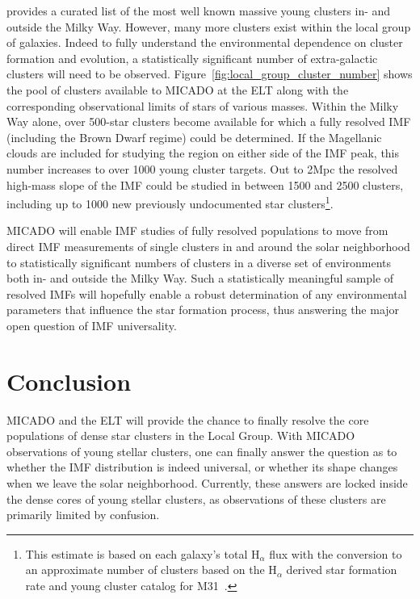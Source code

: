 \documentclass{aa}
\begin{document}
\citet{portegies2010} provides a curated list of the most well known massive young clusters in- and outside the Milky Way.
However, many more clusters exist within the local group of galaxies.
Indeed to fully understand the environmental dependence on cluster formation and evolution, a statistically significant number of extra-galactic clusters will need to be observed.
Figure~\ref{fig:local_group_cluster_number} shows the pool of clusters available to MICADO at the ELT along with the corresponding observational limits of stars of various masses.
Within the Milky Way alone, over 500-star clusters become available for which a fully resolved IMF (including the Brown Dwarf regime) could be determined.
If the Magellanic clouds are included for studying the region on either side of the IMF peak, this number increases to over 1000 young cluster targets.
Out to 2Mpc the resolved high-mass slope of the IMF could be studied in between 1500 and 2500 clusters, including up to 1000 new previously undocumented star clusters\footnote{This estimate is based on each galaxy's total H$_\alpha$ flux with the conversion to an approximate number of clusters based on the H$_\alpha$ derived star formation rate and young cluster catalog for M31~\citep{caldwell09}.}.

MICADO will enable IMF studies of fully resolved populations to move from direct IMF measurements of single clusters in and around the solar neighborhood to statistically significant numbers of clusters in a diverse set of environments both in- and outside the Milky Way.
Such a statistically meaningful sample of resolved IMFs will hopefully enable a robust determination of any environmental parameters that influence the star formation process, thus answering the major open question of IMF universality.




\section{Conclusion}
\label{sec:conclusion}

MICADO and the ELT will provide the chance to finally resolve the core populations of dense star clusters in the Local Group.
With MICADO observations of young stellar clusters, one can finally answer the question as to whether the IMF distribution is indeed universal, or whether its shape changes when we leave the solar neighborhood.
Currently, these answers are locked inside the dense cores of young stellar clusters, as observations of these clusters are primarily limited by confusion.
\end{document}
